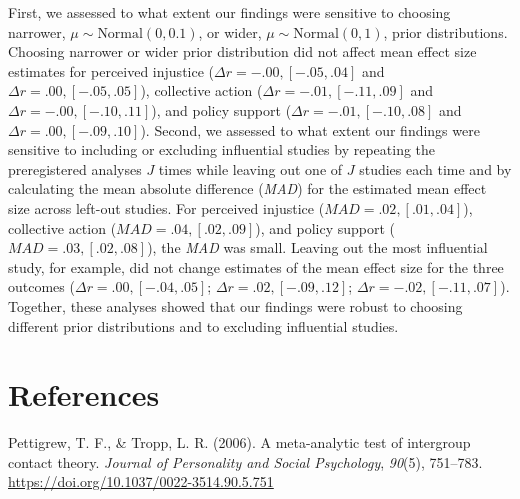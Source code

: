 \documentclass[twocolumn, 10pt, letterpaper]{article}
\begin{document}
First, we assessed to what extent our findings were sensitive to
choosing narrower, \(\mu \sim \text{Normal}(0, 0.1)\), or wider,
\(\mu \sim \text{Normal}(0, 1)\), prior distributions. Choosing narrower
or wider prior distribution did not affect mean effect size estimates
for perceived injustice (\(\Delta r = -.00, [-.05, .04]\) and
\(\Delta r = .00, [-.05, .05]\)), collective action
(\(\Delta r = -.01, [-.11, .09]\) and \(\Delta r = -.00, [-.10, .11]\)),
and policy support (\(\Delta r = -.01, [-.10, .08]\) and
\(\Delta r = .00, [-.09, .10]\)). Second, we assessed to what extent our
findings were sensitive to including or excluding influential studies by
repeating the preregistered analyses \(J\) times while leaving out one
of \(J\) studies each time and by calculating the mean absolute
difference (\emph{MAD}) for the estimated mean effect size across
left-out studies. For perceived injustice
(\(\textit{MAD} = .02, [.01, .04]\)), collective action
(\(\textit{MAD} = .04, [.02, .09]\)), and policy support
(\(\textit{MAD} = .03, [.02, .08]\)), the \emph{MAD} was small. Leaving
out the most influential study, for example, did not change estimates of
the mean effect size for the three outcomes
(\(\Delta r = .00, [-.04, .05]\); \(\Delta r = .02, [-.09, .12]\);
\(\Delta r = -.02, [-.11, .07]\)). Together, these analyses showed that
our findings were robust to choosing different prior distributions and
to excluding influential studies.

\hypertarget{references}{%
\section{References}\label{references}}

\begingroup

\noindent \setlength{\parindent}{-0.5in} \setlength{\leftskip}{0.5in}

\hypertarget{refs}{}
\leavevmode\hypertarget{ref-pettigrew_meta-analytic_2006}{}%
Pettigrew, T. F., \& Tropp, L. R. (2006). A meta-analytic test of
intergroup contact theory. \emph{Journal of Personality and Social
Psychology}, \emph{90}(5), 751--783.
\url{https://doi.org/10.1037/0022-3514.90.5.751}

\endgroup
\end{document}
